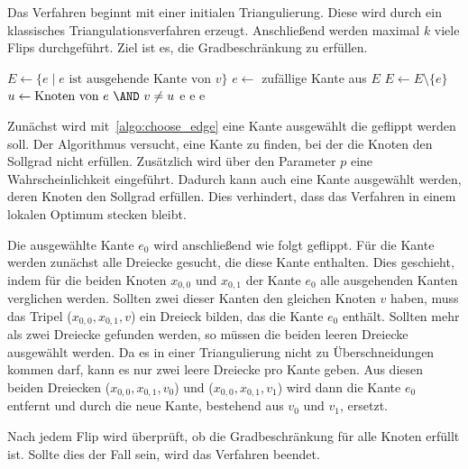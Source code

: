 Das Verfahren beginnt mit einer initialen Triangulierung.
Diese wird durch ein klassisches Triangulationsverfahren erzeugt. 
Anschließend werden maximal \(k\) viele Flips durchgeführt. 
Ziel ist es, die Gradbeschränkung zu erfüllen. 

\begin{algorithm}[h]
	\caption{CHOOSE EDGE(\(v\),\(p\))}
	\label{algo:choose_edge}
	\begin{algorithmic}[1]
		\STATE \(E \gets \{ e \mid e \text{ ist ausgehende Kante von } v \}\)
			\STATE \(e \gets \) zufällige Kante aus \(E\)
			\STATE \(E \gets E \setminus \{e\}\)
			\STATE \(u \gets \text{Knoten von } e~\AND~v \neq u\)
				\RETURN e
				\RETURN e
			\ENDIF
		\ENDWHILE
		\RETURN e
	\end{algorithmic}
\end{algorithm}

Zunächst wird mit~\cref{algo:choose_edge} eine Kante ausgewählt die geflippt werden soll.
Der Algorithmus versucht, eine Kante zu finden, bei der die Knoten den Sollgrad nicht erfüllen. 
Zusätzlich wird über den Parameter \(p\) eine Wahrscheinlichkeit eingeführt. 
Dadurch kann auch eine Kante ausgewählt werden, deren Knoten den Sollgrad erfüllen. 
Dies verhindert, dass das Verfahren in einem lokalen Optimum stecken bleibt. 

Die ausgewählte Kante \(e_0\) wird anschließend wie folgt geflippt.
Für die Kante werden zunächst alle Dreiecke gesucht, die diese Kante enthalten.
Dies geschieht, indem für die beiden Knoten \(x_{0,0}\) und \(x_{0,1}\) der Kante \(e_0\) alle ausgehenden Kanten verglichen werden.
Sollten zwei dieser Kanten den gleichen Knoten \(v\) haben, muss das Tripel (\(x_{0,0}, x_{0,1}, v\)) ein Dreieck bilden, das die Kante \(e_0\) enthält.
Sollten mehr als zwei Dreiecke gefunden werden, so müssen die beiden leeren Dreiecke ausgewählt werden.
Da es in einer Triangulierung nicht zu Überschneidungen kommen darf, kann es nur zwei leere Dreiecke pro Kante geben.
Aus diesen beiden Dreiecken (\(x_{0,0}, x_{0,1}, v_0\)) und (\(x_{0,0}, x_{0,1}, v_1\)) wird dann die Kante \(e_0\) entfernt und durch die neue Kante, bestehend aus \(v_0\) und \(v_1\), ersetzt.

Nach jedem Flip wird überprüft, ob die Gradbeschränkung für alle Knoten erfüllt ist. Sollte dies der Fall sein, wird das Verfahren beendet.



